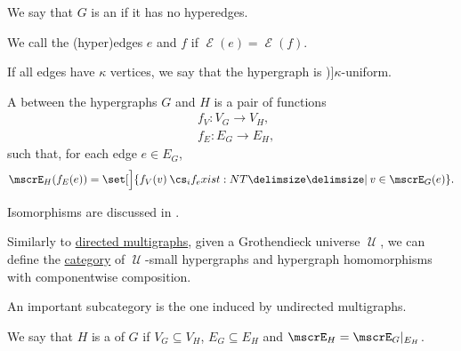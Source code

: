 \begin{definition}
\begin{thmenum}[resume=def:hypergraph/multigraph]
     We say that \( G \) is an  if it has no hyperedges.

    \mimprovised We call the (hyper)edges \( e \) and \( f \)  if \( \mscrE(e) = \mscrE(f) \).

     If all edges have \( \kappa \) vertices, we say that the hypergraph is \term[ru=\( \kappa \)-однородный, en=\( \kappa \)-uniform (\cite[629]{Rosen1999DiscreteHandbook})]{\( \kappa \)-uniform}.

    \mimprovised A  between the hypergraphs \( G \) and \( H \) is a pair of functions
    \begin{align*}
      &f_V: V_G \to V_H, \\
      &f_E: E_G \to E_H,
    \end{align*}
    such that, for each edge \( e \in E_G \),
    \begin{equation}\label{eq:def:hypergraph/homomorphism}
      \mscrE_H(f_E(e)) = \set[\Big]{ f_V(v) \given* v \in \mscrE_G(e) }.
    \end{equation}

    Isomorphisms are discussed in .

    \mimprovised Similarly to \hyperref[def:directed_multigraph]{directed multigraphs}, given a Grothendieck universe \( \mscrU \), we can define the \hyperref[def:category]{category} of \( \mscrU \)-small hypergraphs and hypergraph homomorphisms with componentwise composition.

    An important subcategory is the one induced by undirected multigraphs.

    \mimprovised We say that \( H \) is a  of \( G \) if \( V_G \subseteq V_H \), \( E_G \subseteq E_H \) and \( \mscrE_H = \mscrE_G\restr_{E_H} \).
  \end{thmenum}
\end{definition}
